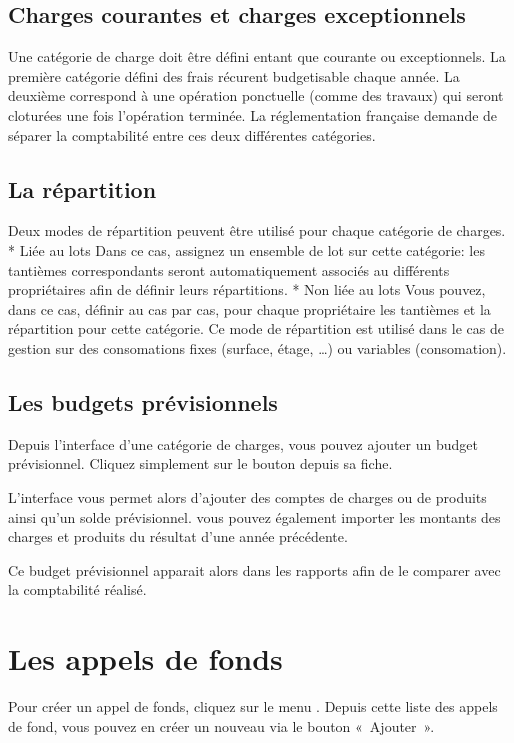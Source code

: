 \documentclass[a4paper,10pt,oneside,french]{sphinxmanual}
\begin{document}
\subsection{Charges courantes et charges exceptionnels}
\label{\detokenize{condominium/classloads:charges-courantes-et-charges-exceptionnels}}
Une catégorie de charge doit être défini entant que courante ou exceptionnels.
La première catégorie défini des frais récurent budgetisable chaque année.
La deuxième correspond à une opération ponctuelle (comme des travaux) qui seront cloturées une fois l’opération terminée.
La réglementation française demande de séparer la comptabilité entre ces deux différentes catégories.


\subsection{La répartition}
\label{\detokenize{condominium/classloads:la-repartition}}
Deux modes de répartition peuvent être utilisé pour chaque catégorie de charges.
* Liée au lots
Dans ce cas, assignez un ensemble de lot sur cette catégorie: les tantièmes correspondants seront automatiquement associés au différents propriétaires afin de définir leurs répartitions.
* Non liée au lots
Vous pouvez, dans ce cas, définir au cas par cas, pour chaque propriétaire les tantièmes et la répartition pour cette catégorie.
Ce mode de répartition est utilisé dans le cas de gestion sur des consomations fixes (surface, étage, …) ou variables (consomation).


\subsection{Les budgets prévisionnels}
\label{\detokenize{condominium/classloads:les-budgets-previsionnels}}
Depuis l’interface d’une catégorie de charges, vous pouvez ajouter un budget prévisionnel.
Cliquez simplement sur le bouton  depuis sa fiche.

L’interface vous permet alors d’ajouter des comptes de charges ou de produits ainsi qu’un solde prévisionnel.
vous pouvez également importer les montants des charges et produits du résultat d’une année précédente.

Ce budget prévisionnel apparait alors dans les rapports afin de le comparer avec la comptabilité réalisé.


\section{Les appels de fonds}
\label{\detokenize{condominium/call_of_funds:les-appels-de-fonds}}\label{\detokenize{condominium/call_of_funds::doc}}
Pour créer un appel de fonds, cliquez sur le menu .
Depuis cette liste des appels de fond, vous pouvez en créer un nouveau via le bouton « Ajouter ».
\end{document}
